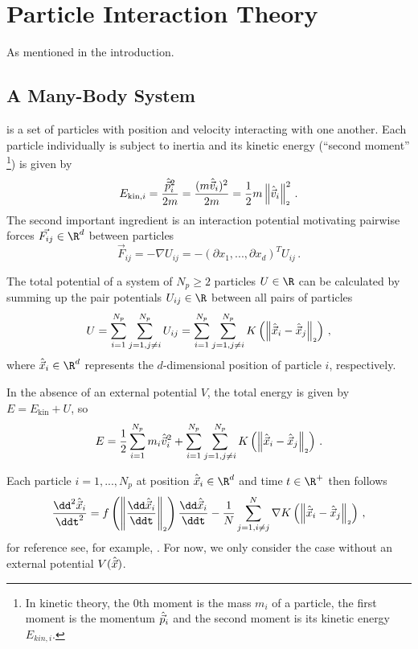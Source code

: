\chapter{Particle Interaction Theory}
\label{chap:particle-interaction-theory}

As mentioned in the introduction.

\section{A Many-Body System}
is a set of particles with position and velocity interacting with one another.
Each particle individually is subject to inertia and its kinetic energy (``second moment'' \footnote{
  In kinetic theory, the $0$th moment is the mass $m_i$ of a particle, the first moment is the momentum $\hat{\vec{p}}_i$ and the second moment is its kinetic energy $E_{kin,i}$.
}) is given by
$$E_{\text{kin},i} = \frac{\hat{\vec{p}}_i^2}{2m} = \frac{(m \hat{\vec{v}}_i)^2}{2m} = \frac{1}{2} m \left\lVert\hat{\vec{v}}_i\right\rVert_{\scriptscriptstyle 2}^2\,.$$
The second important ingredient is an interaction potential motivating pairwise forces $\vec{F_{ij}} \in \R^d$ between particles
$$\vec{F}_{ij} = -\nabla U_{ij} = -\left(\partial x_1, ..., \partial x_d\right)^T U_{ij}\,.$$

The total potential of a system of $N_p \ge 2$ particles $U \in \R$ can be calculated by summing up the pair potentials $U_{ij} \in \R$ between all pairs of particles
$$U = \sum_{i=1}^{N_p}\sum_{j=1, j \neq i}^{N_p} U_{ij} = \sum_{i=1}^{N_p}\sum_{j=1, j \neq i}^{N_p} K\left(\left\lVert\hat{\vec{x}}_i - \hat{\vec{x}}_j\right\rVert_{\scriptscriptstyle 2}\right)\,,$$
where $\hatvec{x}_i \in \R^d$ represents the $d$-dimensional position of particle $i$, respectively.

In the absence of an external potential $V$, the total energy is given by $E = E_{\text{kin}} + U$, so
\begin{equation}
  E = \frac{1}{2} \sum_{i=1}^{N_p} m_i \hat{\vec{v}}_i^2 + \sum_{i=1}^{N_p}\sum_{j=1, j \neq i}^{N_p} K\left(\left\lVert\hat{\vec{x}}_i - \hat{\vec{x}}_j\right\rVert_{\scriptscriptstyle 2}\right)\,.
  \label{eq:total-energy}
\end{equation}

Each particle $i=1, ..., N_p$ at position $\hatvec{x}_i \in \R^d$ and time $t \in \R^+$ then follows
\begin{equation}
  \frac{\dd^2 \hatvec{x}_i}{\ddt^2} = f\left(\norm{\frac{\dd \hatvec{x}_i}{\ddt}}\right) \frac{\dd\hatvec{x}_i}{\ddt} - \frac{1}{N} \sum_{j=1, i\neq j}^{N} \nabla K\left(\norm{\hatvec{x}_i - \hatvec{x}_j}\right)\,,
  \label{eq:evolution-equation}
\end{equation}
for reference see, for example, \parencite{2020-power-law-kernels, 2021-arbitrary-dimensions}.
For now, we only consider the case without an external potential $V(\hat{\vec{x}})$.

